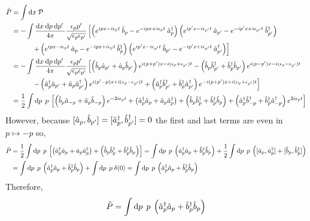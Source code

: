 \documentclass[12pt]{extarticle}
\begin{document}
\begin{align*}
\hat{P} & = \int \mathrm{d}x \: \mathcal{P} 
\\
& = - \int \frac{\mathrm{d}x \: \mathrm{d}p \: \mathrm{d}p' \:}{4 \pi} \frac{\epsilon_p p'}{\sqrt{\epsilon_p \epsilon_{p'}}} \left[
\left( e^{i p x - i \epsilon_p t} \: \hat{b}_p - e^{- i p x + i \epsilon_p t} \: \hat{a}^\dagger_p \right)  \left( e^{i p' x - i \epsilon_{p'} t} \: \hat{a}_{p'} - e^{- i p' x + i \epsilon_{p'} t} \: \hat{b}^\dagger_{p'} \right)
\right.
\\
& \left. \quad \quad \quad + \left( e^{i p x - i \epsilon_p t} \: \hat{a}_p - e^{- i p x + i \epsilon_p t} \: \hat{b}^\dagger_p \right)  \left( e^{i p' x - i \epsilon_{p'} t} \: \hat{b}_{p'} - e^{- i p' x + i \epsilon_{p'} t} \: \hat{a}^\dagger_{p'} \right)  \right]
\\
& = - \int \frac{\mathrm{d}x \: \mathrm{d}p \: \mathrm{d}p' \:}{4 \pi} \frac{\epsilon_p p'}{\sqrt{\epsilon_p \epsilon_{p'}}} \left[ \left( \hat{b}_p \hat{a}_{p'} + \hat{a}_p \hat{b}_{p'} \right) e^{i (p + p') x - i (\epsilon_p + \epsilon_{p'})t} - \left( \hat{b}_p \hat{b}^\dagger_{p'} + \hat{b}^\dagger_p \hat{b}_{p'} \right) e^{i (p - p') x - i (\epsilon_p - \epsilon_{p'})t}  \right.
\\
& \left. \quad \quad \quad - \left( \hat{a}^\dagger_p \hat{a}_{p'} + \hat{a}_p \hat{a}^\dagger_{p'} \right) e^{i (p' - p) x + i (\epsilon_p - \epsilon_{p'})t} + \left( \hat{a}^\dagger_p \hat{b}^\dagger_{p'} + \hat{b}^\dagger_p \hat{a}^\dagger_{p'} \right) e^{-i (p + p') x + i (\epsilon_p + \epsilon_{p'})t} \right]
\\
& = \frac{1}{2} \int \mathrm{d}p \: \: p \: \left[ \left( \hat{b}_p \hat{a}_{-p} + \hat{a}_p \hat{b}_{-p} \right) e^{- 2 i \epsilon_p t} + \left( \hat{a}^\dagger_p \hat{a}_{p} + \hat{a}_p \hat{a}^\dagger_{p} \right) + \left( \hat{b}_p \hat{b}^\dagger_{p} + \hat{b}^\dagger_p \hat{b}_{p} \right) + \left( \hat{a}^\dagger_p \hat{b}^\dagger_{-p} + \hat{b}^\dagger_p \hat{a}^\dagger_{-p} \right) e^{2 i \epsilon_p  t} \right]
\end{align*}
However, because $[\hat{a}_p, \hat{b}_{p'}] = [\hat{a}^\dagger_p, \hat{b}^\dagger_{p'}] = 0$ the first and last terms are even in $p \mapsto -p$ so,
\begin{align*}
\hat{P} & = \frac{1}{2} \int \mathrm{d}p \: \: p \: \left[\left( \hat{a}^\dagger_p \hat{a}_{p} + \hat{a}_p \hat{a}^\dagger_{p} \right) + \left( \hat{b}_p \hat{b}^\dagger_{p} + \hat{b}^\dagger_p \hat{b}_{p} \right) \right] = \int \mathrm{d}p \: \: p \: \left(\hat{a}^\dagger_p \hat{a}_{p} + \hat{b}^\dagger_p \hat{b}_{p} \right) + \frac{1}{2} \int \mathrm{d}p \: \: p \: \left( [ \hat{a}_p, \hat{a}^\dagger_{p} ] + [ \hat{b}_p, \hat{b}^\dagger_{p} ] \right)
\\
& = \int \mathrm{d}p \: \: p \: \left(\hat{a}^\dagger_p \hat{a}_{p} + \hat{b}^\dagger_p \hat{b}_{p} \right) + \int \mathrm{d}p \: \: p \: \delta(0) = \int \mathrm{d}p \: \: p \: \left(\hat{a}^\dagger_p \hat{a}_{p} + \hat{b}^\dagger_p \hat{b}_{p} \right)
\end{align*} 
Therefore,
\[ \hat{P} = \int \mathrm{d}p \: \: p \: \left(\hat{a}^\dagger_p \hat{a}_{p} + \hat{b}^\dagger_p \hat{b}_{p} \right)\]
\bigskip\\
\end{document}
